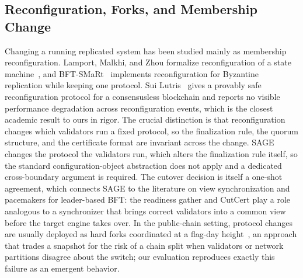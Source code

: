 \documentclass[journal]{IEEEtran}
\begin{document}
\subsection{Reconfiguration, Forks, and Membership Change}
Changing a running replicated system has been studied mainly as membership reconfiguration.
Lamport, Malkhi, and Zhou formalize reconfiguration of a state machine~\cite{reconfig}, and
BFT-SMaRt~\cite{bftsmart} implements reconfiguration for Byzantine replication while keeping
one protocol. Sui Lutris~\cite{suilutris} gives a provably safe reconfiguration protocol for a
consensusless blockchain and reports no visible performance degradation across reconfiguration
events, which is the closest academic result to ours in rigor. The crucial distinction is that
reconfiguration changes which validators run a fixed protocol, so the finalization rule, the
quorum structure, and the certificate format are invariant across the change. SAGE changes the
protocol the validators run, which alters the finalization rule itself, so the standard
configuration-object abstraction does not apply and a dedicated cross-boundary argument is
required. The cutover decision is itself a one-shot agreement, which connects SAGE to the
literature on view synchronization and pacemakers for leader-based BFT: the readiness gather and
CutCert play a role analogous to a synchronizer that brings correct validators into a common
view before the target engine takes over. In the public-chain setting, protocol changes are
usually deployed as hard forks coordinated at a flag-day height~\cite{tendermint,bitcoin}, an
approach that trades a snapshot for the risk of a chain split when validators or network
partitions disagree about the switch; our evaluation reproduces exactly this failure as an
emergent behavior.
\end{document}
